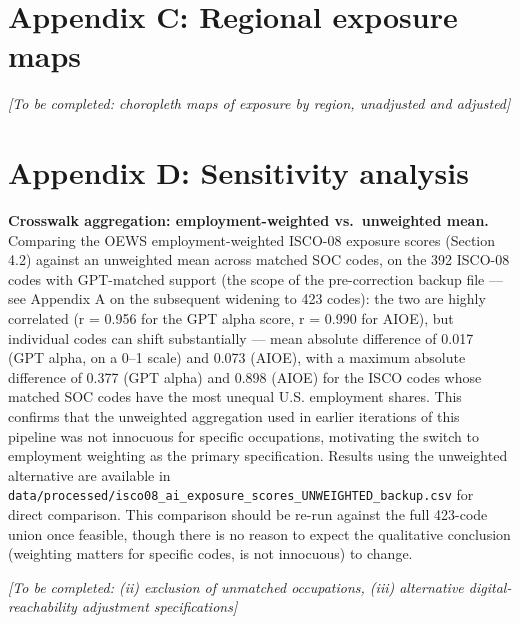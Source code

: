 \documentclass[
  11pt,
]{article}
\begin{document}
\section{Appendix C: Regional exposure
maps}\label{appendix-c-regional-exposure-maps}

\emph{{[}To be completed: choropleth maps of exposure by region,
unadjusted and adjusted{]}}

\section{Appendix D: Sensitivity
analysis}\label{appendix-d-sensitivity-analysis}

\textbf{Crosswalk aggregation: employment-weighted vs.~unweighted mean.}
Comparing the OEWS employment-weighted ISCO-08 exposure scores (Section
4.2) against an unweighted mean across matched SOC codes, on the 392
ISCO-08 codes with GPT-matched support (the scope of the pre-correction
backup file --- see Appendix A on the subsequent widening to 423 codes):
the two are highly correlated (r = 0.956 for the GPT alpha score, r =
0.990 for AIOE), but individual codes can shift substantially --- mean
absolute difference of 0.017 (GPT alpha, on a 0--1 scale) and 0.073
(AIOE), with a maximum absolute difference of 0.377 (GPT alpha) and
0.898 (AIOE) for the ISCO codes whose matched SOC codes have the most
unequal U.S. employment shares. This confirms that the unweighted
aggregation used in earlier iterations of this pipeline was not
innocuous for specific occupations, motivating the switch to employment
weighting as the primary specification. Results using the unweighted
alternative are available in
\texttt{data/processed/isco08\_ai\_exposure\_scores\_UNWEIGHTED\_backup.csv}
for direct comparison. This comparison should be re-run against the full
423-code union once feasible, though there is no reason to expect the
qualitative conclusion (weighting matters for specific codes, is not
innocuous) to change.

\emph{{[}To be completed: (ii) exclusion of unmatched occupations, (iii)
alternative digital-reachability adjustment specifications{]}}
\end{document}
